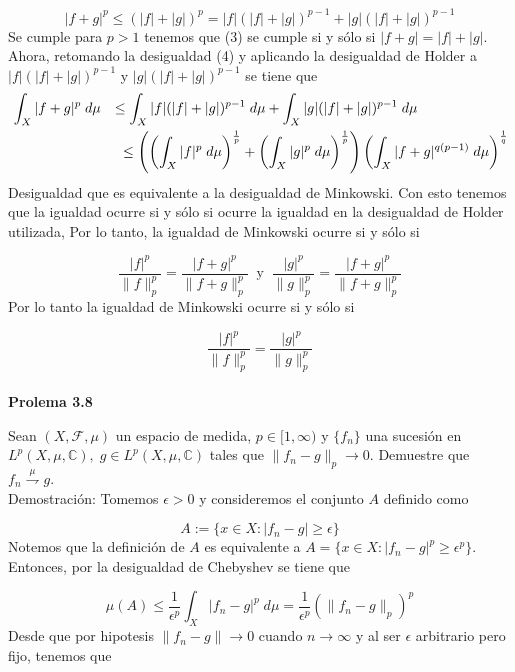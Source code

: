 \documentclass[12pt]{article}
\begin{document}
    \[|f+g|^p \leq (|f|+|g|)^p = |f|(|f|+|g|)^{p-1}+|g|(|f|+|g|)^{p-1}\] 
    Se cumple para $p > 1$ tenemos que (3) se cumple si y s\'olo si
    $|f+g| = |f|+|g|$. Ahora, retomando la desigualdad (4) y aplicando la desigualdad de 
    Holder a $|f|(|f|+|g|)^{p-1}$ y $|g|(|f|+|g|)^{p-1}$ se tiene que 
    \begin{equation*}
        \begin{aligned}
            & \int_X|f+g|^p\;d\mu & \leq  \int_X|f|(|f|+|g|)^{p-1}\;d\mu+\int_X|g|(|f|+|g|)^{p-1}\;d\mu \hspace*{65pt} \\
            & & \leq \left( \left( \int_X |f|^p\;d\mu\right)^{\frac{1}{p}}+\left( \int_X |g|^p\;d\mu \right)^{\frac{1}{p}} \right)\left( \int_X |f+g|^{q(p-1)}\;d\mu \right)^{\frac{1}{q}}
        \end{aligned}
    \end{equation*}
    Desigualdad que es equivalente a la desigualdad de Minkowski. Con esto tenemos que la 
    igualdad ocurre si y s\'olo si ocurre la igualdad en la desigualdad de Holder utilizada,
    Por lo tanto, la igualdad de Minkowski ocurre si y s\'olo si 
    
    \[\frac{|f|^p}{\|f\|_p^p} = \frac{|f+g|^p}{\|f+g\|_p^p}\;\; \text{y}\;\; \frac{|g|^p}{\|g\|_p^p} = \frac{|f+g|^p}{\|f+g\|_p^p}\]
    Por lo tanto la igualdad de Minkowski ocurre si y s\'olo si

    \[\frac{|f|^p}{\|f\|_p^p} = \frac{|g|^p}{\|g\|_p^p}\]
    \\

    \textbf{Prolema 3.8}

    Sean $(X,\mathcal{F},\mu)$ un espacio de medida, $p\in [1,\infty)$ y $\{f_n\}$ una 
    sucesi\'on en $L^p(X,\mu,\mathbb{C}),\; g\in L^p(X,\mu,\mathbb{C})$ tales que 
    $\|f_n-g\|_p\rightarrow 0$. Demuestre que $f_n \overset{\mu}{\rightharpoondown} g$.
    \\
    
    Demostraci\'on: Tomemos $\epsilon > 0$ y consideremos el conjunto $A$ definido como 

    \[A := \{x\in X : |f_n-g| \geq \epsilon\}\]
    Notemos que la definici\'on de $A$ es equivalente a 
    $A = \{x\in X : |f_n-g|^p \geq \epsilon^p\}$. Entonces, por la desigualdad de Chebyshev
    se tiene que 

    \[\mu(A) \leq \frac{1}{\epsilon^p}\int_X |f_n-g|^p\;d\mu = \frac{1}{\epsilon^p}(\|f_n-g\|_p)^p\]
    Desde que por hipotesis $\|f_n-g\|\rightarrow 0$ cuando $n\rightarrow \infty$ y al ser
    $\epsilon$ arbitrario pero fijo, tenemos que 
\end{document}

